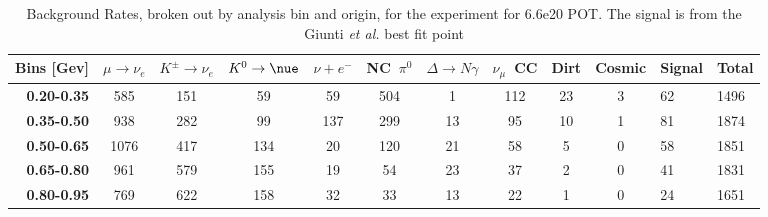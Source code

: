 \begin{table}
\centering

\caption{Background Rates, broken out by analysis bin and origin, for the \icarus experiment for 6.6e20 POT. The signal is from the Giunti {\em et al.} best fit point}
\begin{tabular}{r|cccccccccll}
\multicolumn{1}{l|}{Bins [Gev]} & \multicolumn{1}{l}{$\mu\rightarrow\nu_e$} & \multicolumn{1}{l}{$K^{\pm}\rightarrow \nu_e$} & \multicolumn{1}{l}{$K^0 \rightarrow \nue$} & \multicolumn{1}{l}{$\nu + e^-$} & \multicolumn{1}{l}{NC~$\pi^0$} & \multicolumn{1}{l}{$\Delta \rightarrow N\gamma$} & \multicolumn{1}{l}{$\nu_{\mu}$~CC} & \multicolumn{1}{l}{Dirt} & \multicolumn{1}{l}{Cosmic} & Signal & Total \\ \hline
\textbf{0.20-0.35}        & 585                         & 151                         & 59                          & 59                       & 504                        & 1                          & 112                        & 23                       & 3                          & 62     & 1496  \\
\textbf{0.35-0.50}        & 938                         & 282                         & 99                          & 137                      & 299                        & 13                         & 95                         & 10                       & 1                          & 81     & 1874  \\
\textbf{0.50-0.65}        & 1076                        & 417                         & 134                         & 20                       & 120                        & 21                         & 58                         & 5                        & 0                          & 58     & 1851  \\
\textbf{0.65-0.80}        & 961                         & 579                         & 155                         & 19                       & 54                         & 23                         & 37                         & 2                        & 0                          & 41     & 1831  \\
\textbf{0.80-0.95}        & 769                         & 622                         & 158                         & 32                       & 33                         & 13                         & 22                         & 1                        & 0                          & 24     & 1651  \\

\end{tabular}
\end{table}
